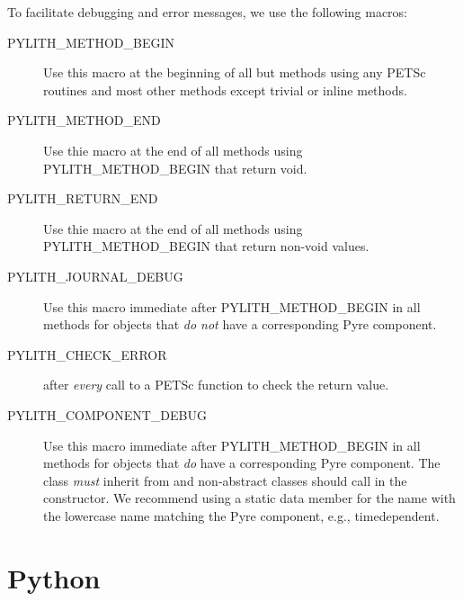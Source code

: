 To facilitate debugging and error messages, we use the following
macros:
\begin{description}
\item[PYLITH\_METHOD\_BEGIN] Use this macro at the beginning of all
  but methods using any PETSc routines and most other methods except
  trivial or inline methods.
\item[PYLITH\_METHOD\_END] Use thie macro at the end of all methods
  using PYLITH\_METHOD\_BEGIN that return void.
\item[PYLITH\_RETURN\_END] Use thie macro at the end of all methods
  using PYLITH\_METHOD\_BEGIN that return non-void values.
\item[PYLITH\_JOURNAL\_DEBUG] Use this macro immediate after
  PYLITH\_METHOD\_BEGIN in all methods for objects that {\em do not} have a corresponding
  Pyre component.
\item[PYLITH\_CHECK\_ERROR] after {\em every} call to a PETSc function
  to check the return value.
\item[PYLITH\_COMPONENT\_DEBUG] Use this macro immediate after
  PYLITH\_METHOD\_BEGIN in all methods for objects that {\em do} have
  a corresponding Pyre component. The class {\em must} inherit from
   and non-abstract classes
  should call  in the constructor. We
  recommend using a static data member for the name with the lowercase
  name matching the Pyre component, e.g., timedependent.
\end{description}




\section{Python}


